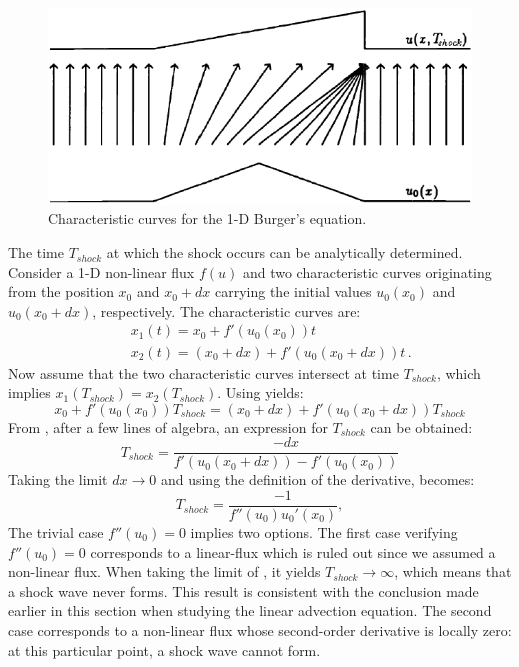 %
\begin{figure}[H]
\centering
\includegraphics[width=\textwidth]{figures/shock_formation_burger.png}
\caption{Characteristic curves for the 1-D Burger's equation.}
\label{fig:char_curve_bg_sct1b}
\end{figure}
%
The time $T_{shock}$ at which the shock occurs can be analytically determined. Consider a 1-D non-linear flux $f(u)$ and two characteristic curves originating from the position $x_0$ and $x_0+dx$ carrying the initial values $u_0(x_0)$ and $u_0(x_0+dx)$, respectively. The characteristic curves are:
%
\begin{eqnarray}\label{eq:cc1_sct1b}
&&x_1(t) = x_0 + f'(u_0(x_0)) t \nonumber \\ 
&&x_2(t) = (x_0 + dx) + f'(u_0(x_0+dx)) t \, .
\end{eqnarray}
%
Now assume that the two characteristic curves intersect at time $T_{shock}$, which implies $x_1(T_{shock}) = x_2(T_{shock})$. Using  yields:
%
\begin{equation}\label{eq:cc1b_sct1b}
x_0 + f'(u_0(x_0)) T_{shock} = (x_0 + dx) + f'(u_0(x_0+dx)) T_{shock}
\end{equation}
%
From , after a few lines of algebra, an expression for $T_{shock}$ can be obtained: 
\begin{equation}\label{eq:cc2a_sct1b}
T_{shock} = \frac{-dx}{f'(u_0(x_0+dx))-f'(u_0(x_0))}
\end{equation}
Taking the limit $dx \to 0$ and using the definition of the derivative,  becomes:
\begin{equation}\label{eq:cc2_sct1b}
T_{shock} = \frac{-1}{f''(u_0) u_0'(x_0)}, 
\end{equation} 
The trivial case $f''(u_0) = 0$ implies two options. The first case verifying $f''(u_0) = 0$ corresponds to a linear-flux which is ruled out since we assumed a non-linear flux. When taking the limit of , it yields $T_{shock} \to \infty$, which means that a shock wave never forms. This result is consistent with the conclusion made earlier in this section when studying the linear advection equation. The second case corresponds to a non-linear flux whose second-order derivative is locally zero: at this particular point, a shock wave cannot form. 

